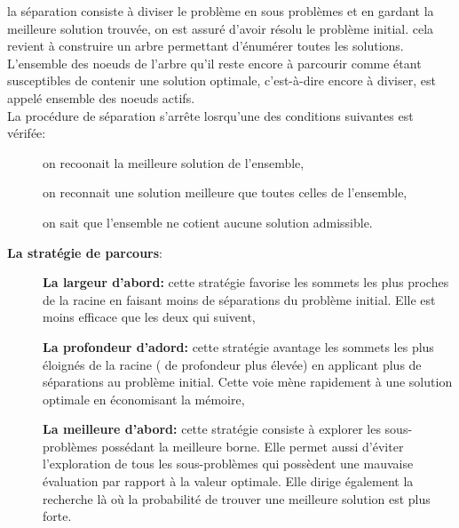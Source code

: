 \documentclass[a4paper,11pt,oneside]{report}
\theoremstyle{plain}
\newcommand{\0}{/ \! \! \! 0}
\theoremstyle{plain}
\begin{document}
 \begin{description}
 \item la s\'eparation consiste \`a diviser le probl\`eme en sous probl\`emes et en gardant la meilleure solution trouv\'ee, on est assur\'e d'avoir r\'esolu
  le probl\`eme initial. cela revient \`a construire un arbre permettant d'\'enum\'erer toutes les solutions. L'ensemble des noeuds de l'arbre qu'il reste
  encore \`a parcourir comme \'etant susceptibles de contenir une solution optimale, c'est-\`a-dire encore \`a diviser, est appel\'e ensemble des noeuds actifs.\\
  La proc\'edure de s\'eparation s'arr\^ete losrqu'une des conditions suivantes est v\'erif\'ee:
  \begin{description}
   \item[] on recoonait la meilleure solution de l'ensemble,
   \item[] on reconnait une solution meilleure que toutes celles de l'ensemble,
   \item[] on sait que l'ensemble ne cotient aucune solution admissible.
  \end{description}
 \end{description}
  {\bf La strat\'egie de parcours}:
 \begin{description}
  \item[] {\bf La largeur d'abord:} cette strat\'egie favorise les sommets les plus proches de la racine en faisant moins de s\'eparations du probl\`eme 
  initial. Elle est moins efficace que les deux qui suivent, 
  \item[] {\bf La profondeur d'adord:} cette strat\'egie avantage les sommets les plus \'eloign\'es de la racine ( de profondeur plus \'elev\'ee) en applicant
   plus de s\'eparations au probl\`eme initial. Cette voie m\`ene rapidement \`a une solution optimale en \'economisant la m\'emoire,
  \item[] {\bf La meilleure d'abord:} cette strat\'egie consiste \`a explorer les sous-probl\`emes poss\'edant la meilleure borne. Elle permet aussi d'\'eviter l'exploration
   de tous les sous-probl\`emes qui poss\`edent une mauvaise \'evaluation par rapport \`a la valeur optimale. Elle dirige \'egalement la recherche l\`a o\`u
    la probabilit\'e de trouver une meilleure solution est plus forte.
 \end{description}
\end{document}
